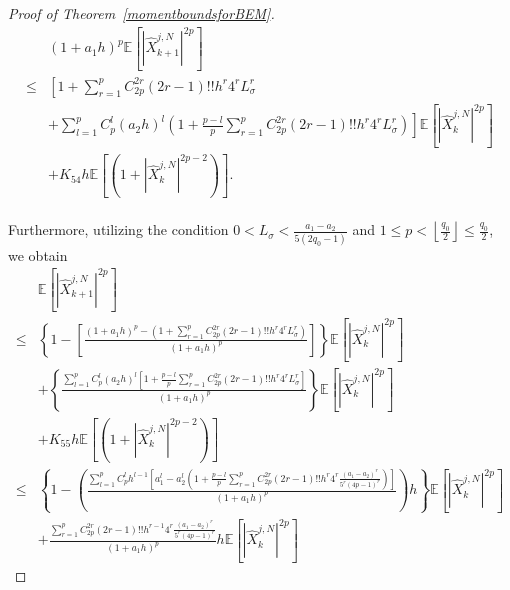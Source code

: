 \documentclass[12pt]{article}
\numberwithin{equation}{section}
\begin{document}
\begin{proof}[Proof of Theorem~\ref{momentboundsforBEM}]
\begin{equation}
\begin{aligned}
&\left( 1+a_1h \right) ^p\mathbb{E} \left[ \left| \hat{X}_{k+1}^{j,N} \right|^{2p} \right] 
\\
\le& \left[ 1+\sum_{r=1}^p{C_{2p}^{2r}\left( 2r-1 \right) !!h^r4^rL_{\sigma}^{r}}\right.\\
&\left.+\sum_{l=1}^p{C_{p}^{l}\left( a_2h \right) ^l\left( 1+\tfrac{p-l}{p}\sum_{r=1}^p{C_{2p}^{2r}\left( 2r-1 \right) !!h^r4^rL_{\sigma}^{r}} \right)} \right] \mathbb{E} \left[ \left| \hat{X}_{k}^{j,N} \right|^{2p}\right] 
\\
&+K_{54}h \mathbb{E} \left[\left( 1+\left|\hat{X}_{k}^{j,N}\right|^{2p-2} \right)\right]. 
\end{aligned}
\end{equation}\\
Furthermore, utilizing the condition $0 < L_\sigma < \frac{a_1 - a_2}{5\left(2q_0 - 1\right)}$ and $1 \leq p < \left\lfloor \frac{q_0}{2} \right\rfloor \leq\frac{q_0}{2}$, we obtain 
\begin{equation}\tag{5.121}\label{6.18}
\begin{aligned}
&\mathbb{E} \left[ \left| \hat{X}_{k+1}^{j,N} \right|^{2p}\right] 
\\
\le &\left\{ 1-\left[ \tfrac{\left( 1+a_1h \right) ^p-\left( 1+\sum_{r=1}^p{C_{2p}^{2r}\left( 2r-1 \right) !!h^r4^rL_{\sigma}^{r}} \right)}{\left( 1+a_1h \right) ^p} \right] \right\}  \mathbb{E} \left[\left| \hat{X}_{k}^{j,N} \right|^{2p} \right]
\\
&+\left\{ \tfrac{\sum_{l=1}^p{C_{p}^{l}\left( a_2h \right) ^l\left[ 1+\tfrac{p-l}{p}\sum_{r=1}^p{C_{2p}^{2r}\left( 2r-1 \right) !!h^r4^rL_{\sigma}^{r}} \right]}}{\left( 1+a_1h \right) ^p} \right\}  \mathbb{E} \left[\left| \hat{X}_{k}^{j,N} \right|^{2p}\right] 
\\
&+K_{55}h \mathbb{E} \left[\left( 1+\left|\hat{X}_{k}^{j,N}\right|^{2p-2} \right)\right] 
\\
\le& \left\{ 1-\left( \tfrac{\sum_{l=1}^p{C_{p}^{l}h^{l-1}\left[ a_{1}^{l}-a_{2}^{l}\left( 1+\tfrac{p-l}{p}\sum_{r=1}^p{C_{2p}^{2r}\left( 2r-1 \right) !!h^r4^r\tfrac{\left( a_1-a_2 \right) ^r}{5^r\left( 4p-1 \right) ^r}} \right) \right]}}{\left( 1+a_1h \right) ^p} \right) h \right\}  \mathbb{E} \left[\left| \hat{X}_{k}^{j,N} \right|^{2p}\right]  
\\
&+ \tfrac{\sum_{r=1}^p{C_{2p}^{2r}\left( 2r-1 \right) !!h^{r-1}4^r\tfrac{\left( a_1-a_2 \right) ^r}{5^r\left( 4p-1 \right) ^r}}}{\left( 1+a_1h \right) ^p} h  \mathbb{E} \left[\left| \hat{X}_{k}^{j,N} \right|^{2p}\right] 

\end{aligned}
\end{equation}
\end{proof}
\end{document}
